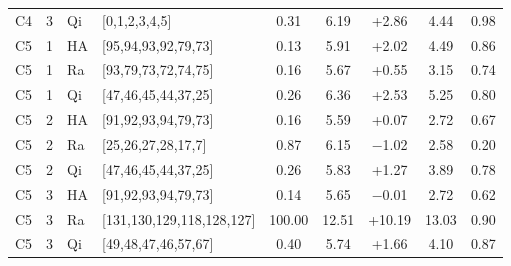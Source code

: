 \begin{tabular}[t]{@{}lclp{2.75cm}ccccc@{}}
C4 & 3 & Qi & [0,1,2,3,4,5] & 0.31 & 6.19 & +2.86 & 4.44 & 0.98 \\
C5 & 1 & HA & [95,94,93,92,79,73] & 0.13 & 5.91 & +2.02 & 4.49 & 0.86 \\
C5 & 1 & Ra & [93,79,73,72,74,75] & 0.16 & 5.67 & +0.55 & 3.15 & 0.74 \\
C5 & 1 & Qi & [47,46,45,44,37,25] & 0.26 & 6.36 & +2.53 & 5.25 & 0.80 \\
C5 & 2 & HA & [91,92,93,94,79,73] & 0.16 & 5.59 & +0.07 & 2.72 & 0.67 \\
C5 & 2 & Ra & [25,26,27,28,17,7] & 0.87 & 6.15 & $-$1.02 & 2.58 & 0.20 \\
C5 & 2 & Qi & [47,46,45,44,37,25] & 0.26 & 5.83 & +1.27 & 3.89 & 0.78 \\
C5 & 3 & HA & [91,92,93,94,79,73] & 0.14 & 5.65 & $-$0.01 & 2.72 & 0.62 \\
C5 & 3 & Ra & [131,130,129,118,128,127] & 100.00 & 12.51 & +10.19 & 13.03 & 0.90 \\
C5 & 3 & Qi & [49,48,47,46,57,67] & 0.40 & 5.74 & +1.66 & 4.10 & 0.87 \\
\bottomrule
\end{tabular}
